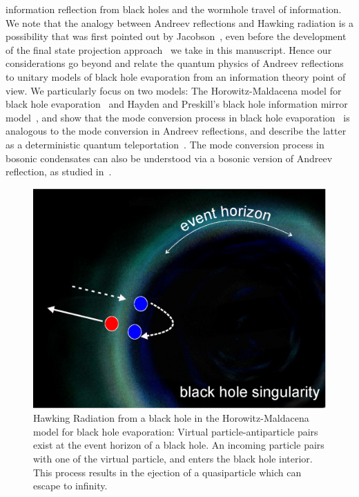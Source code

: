 \documentclass[10pt,letterpaper,aps,onecolumn,superscriptaddress,floatfix,notitlepage]{revtex4-1}
\begin{document}
	information reflection from black holes and the wormhole travel of information. We note that the analogy between Andreev reflections and Hawking radiation is a possibility that was first pointed out by Jacobson~\cite{bhmodes}, even before the development of the final state projection approach~\cite{projection,horowitz} we take in this manuscript. Hence our considerations go beyond and relate the quantum physics of Andreev reflections to unitary models of black hole evaporation from an information theory point of view. We particularly focus on two models: The Horowitz-Maldacena model for black hole evaporation~\cite{horowitz} and Hayden and Preskill's black hole information mirror model~\cite{preskill}, and show that the mode conversion process in black hole evaporation~\cite{bhmodes,horowitz,preskill} is analogous to the mode conversion in Andreev reflections, and describe the latter as a deterministic quantum teleportation~\cite{CTC}. The mode conversion process in bosonic condensates can also be understood via a bosonic version of Andreev reflection, as studied in~\cite{zapata2011resonant,zapata2009andreev}.
	\begin{figure}
		\includegraphics[scale=0.5]{fig1.eps}
		\caption{Hawking Radiation from a black hole in the Horowitz-Maldacena model for black hole evaporation: Virtual particle-antiparticle pairs exist at the event horizon of a black hole.  An incoming particle pairs with one of the virtual particle, and enters the black hole interior.  This process results in the ejection of a quasiparticle which can escape to infinity.\label{cosmos}}
	\end{figure}
	
\end{document}
